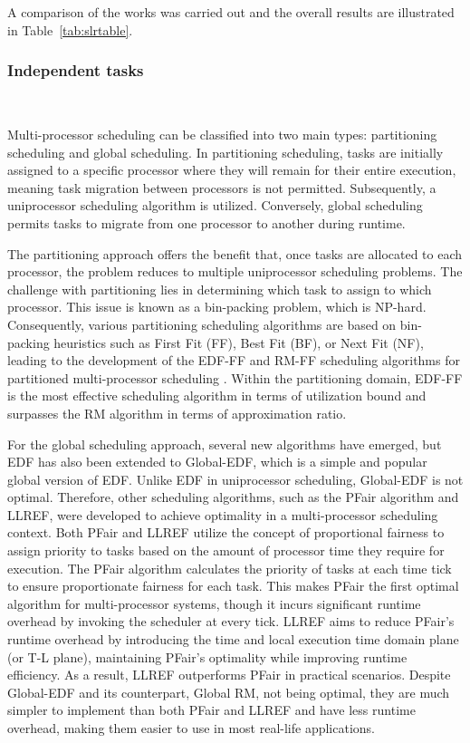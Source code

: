 A comparison of the works was carried out and the overall results are illustrated in Table~\ref{tab:slrtable}.

\subsubsection{Independent tasks}
~

Multi-processor scheduling can be classified into two main types: 
partitioning scheduling and global scheduling. In partitioning 
scheduling, tasks are initially assigned to a specific processor 
where they will remain for their entire execution, meaning task 
migration between processors is not permitted. Subsequently, a 
uniprocessor scheduling algorithm is utilized. Conversely, global 
scheduling permits tasks to migrate from one processor to another 
during runtime.

The partitioning approach offers the benefit that, once tasks 
are allocated to each processor, the problem reduces to multiple 
uniprocessor scheduling problems. The challenge with partitioning 
lies in determining which task to assign to which processor. 
This issue is known as a bin-packing problem, which is 
NP-hard\cite{bin_packing_pb}. Consequently, various partitioning 
scheduling algorithms are based on bin-packing heuristics such 
as First Fit (FF), Best Fit (BF), or Next Fit (NF), leading to 
the development of the EDF-FF and RM-FF scheduling algorithms 
for partitioned multi-processor scheduling\cite{oh1993tightRMFFBound}
\cite{lopez2000wcUEDF}. Within the partitioning domain, 
EDF-FF is the most effective scheduling algorithm in terms of 
utilization bound and surpasses the RM algorithm in terms of 
approximation ratio\cite{lopez2000wcUEDF}.

For the global scheduling approach, several new algorithms have 
emerged, but EDF has also been extended to Global-EDF, which is a 
simple and popular global version of EDF\cite{li2015globalEDF}. 
Unlike EDF in uniprocessor scheduling, Global-EDF is not optimal. 
Therefore, other scheduling algorithms, such as the PFair\cite{baruah1993PFair} 
algorithm and LLREF\cite{cho2006LLREF}, were developed to achieve 
optimality in a multi-processor scheduling context. Both PFair and 
LLREF utilize the concept of proportional fairness to assign 
priority to tasks based on the amount of processor time they 
require for execution. The PFair algorithm calculates the priority 
of tasks at each time tick to ensure proportionate fairness for each 
task. This makes PFair the first optimal algorithm for multi-processor 
systems, though it incurs significant runtime overhead by invoking 
the scheduler at every tick. LLREF aims to reduce PFair's runtime 
overhead by introducing the time and local execution time domain 
plane (or T-L plane), maintaining PFair's optimality while improving 
runtime efficiency. As a result, LLREF outperforms PFair in 
practical scenarios. Despite Global-EDF and its counterpart, 
Global RM, not being optimal, they are much simpler to implement 
than both PFair and LLREF and have less runtime overhead, making 
them easier to use in most real-life applications.

